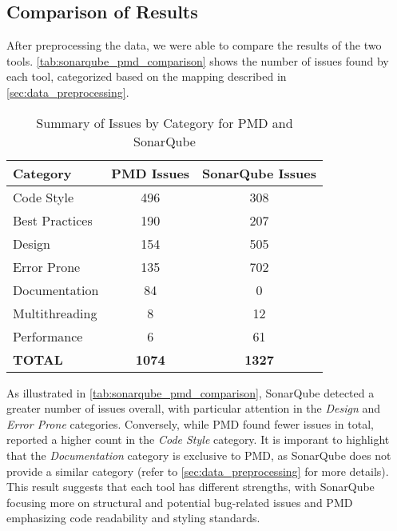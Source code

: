 \subsection{Comparison of Results}

After preprocessing the data, we were able to compare the results of the two tools. \autoref{tab:sonarqube_pmd_comparison} shows the number of issues found by each tool, categorized based on the mapping described in \autoref{sec:data_preprocessing}.

\begin{table}[H]
	\centering
	\begin{tabular}{|l|c|c|}
		\hline
		\textbf{Category} & \textbf{PMD Issues} & \textbf{SonarQube Issues} \\
		\hline
		Code Style        & 496                 & 308                       \\
		Best Practices    & 190                 & 207                       \\
		Design            & 154                 & 505                       \\
		Error Prone       & 135                 & 702                       \\
		Documentation     & 84                  & 0                         \\
		Multithreading    & 8                   & 12                        \\
		Performance       & 6                   & 61                        \\
		\textbf{TOTAL}    & \textbf{1074}       & \textbf{1327}             \\
		\hline
	\end{tabular}
	\caption{Summary of Issues by Category for PMD and SonarQube}
	\label{tab:sonarqube_pmd_comparison}
\end{table}

\noindent As illustrated in \autoref{tab:sonarqube_pmd_comparison}, SonarQube detected a greater number of issues overall, with particular attention in the \textit{Design} and \textit{Error Prone} categories. Conversely, while PMD found fewer issues in total, reported a higher count in the \textit{Code Style} category. It is imporant to highlight that the \textit{Documentation} category is exclusive to PMD, as SonarQube does not provide a similar category (refer to \autoref{sec:data_preprocessing} for more details). This result suggests that each tool has different strengths, with SonarQube focusing more on structural and potential bug-related issues and PMD emphasizing code readability and styling standards.

